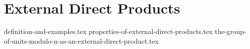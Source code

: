 \chapter{External Direct Products}
{definition-and-examples.tex}
{properties-of-external-direct-products.tex}
{the-group-of-units-modulo-n-as-an-external-direct-product.tex}

